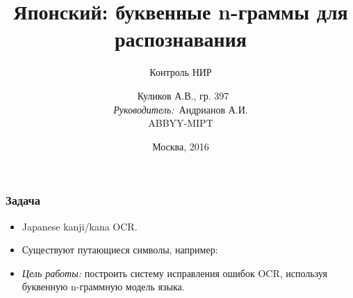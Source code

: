 \documentclass[14pt]{beamer}
\title{\small{Японский: буквенные n-граммы для распознавания}}
\subtitle{\footnotesize{Контроль НИР}}
\author{\small{%
~Куликов А.В., гр. 397\\%
\emph{Руководитель:}~Андрианов А.И.}\\%
\vspace{30pt}%
ABBYY-MIPT%
\vspace{20pt}%
}
\date{\small{Москва, 2016}}
\begin{document}
\maketitle

\begin{frame}

\frametitle{Задача}
\begin{itemize}
    \item Japanese kanji/kana OCR.
    \item Существуют путающиеся символы, например:
    \begin{figure}[h]
    \end{figure}
    \item \emph{Цель работы: } построить систему исправления ошибок OCR, используя буквенную n-граммную модель языка.
\end{itemize}
\end{frame}
\end{document}
